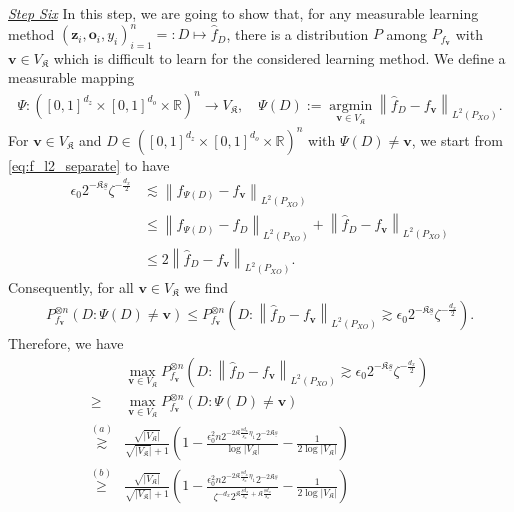 \documentclass[11pt]{article}
\newcommand{\bz}{\mathbf z}
\newcommand{\bv}{\mathbf v}
\newcommand{\bo}{\mathbf o}
\newcommand{\R}{\mathbb{R}}
\newcommand{\0}{\mathbf{0}}
\begin{document}
\begin{appendix}
\vspace{3mm}
\noindent
\underline{\emph{Step Six}}
In this step, we are going to show that, for any measurable learning method $(\bz_i, \bo_i,y_i)_{i=1}^n =: D \mapsto \hat{f}_D$, there is a distribution $P$ among $P_{f_\bv}$ with $\bv \in V_\mathfrak{K}$ which is difficult to learn for the considered learning method. We define a measurable mapping
\begin{align}
    \Psi:\left([0,1]^{d_z}\times[0,1]^{d_o}\times\R\right)^n \rightarrow V_\mathfrak{K}, \quad \Psi(D) := \underset{\bv \in V_\mathfrak{K}}{\operatorname{argmin}} \left\| \hat{f}_D -f_{\bv} \right\|_{L^2(P_{XO})} .
\end{align}
For $\bv \in V_\mathfrak{K}$ and $D \in \left([0,1]^{d_z}\times[0,1]^{d_o}\times\R\right)^n $ with $\Psi(D) \neq \bv$, we start from \eqref{eq:f_l2_separate} to have
\begin{align*}
    \epsilon_0 2^{-\mathfrak{K}\underline{s}} \zeta^{-\frac{d_x}{2}} &\lesssim \left\|f_{\Psi(D)} - f_{\bv} \right\|_{L^2(P_{XO})}\\ &\leq\left\|f_{\Psi(D)} -\hat{f}_D \right\|_{L^2(P_{XO})} + \left\|\hat{f}_D - f_{\bv} \right\|_{L^2(P_{XO})}\\ &\leq 2\left\|\hat{f}_D - f_{\bv} \right\|_{L^2(P_{XO})} .
\end{align*}
Consequently, for all $\bv \in V_\mathfrak{K}$ we find
\begin{align*}
    P_{f_\bv}^{\otimes n}(D: \Psi(D) \neq \bv) \leq P_{f_\bv}^{\otimes n} \left(D:\left\|\hat{f}_D - f_{\bv} \right\|_{L^2(P_{XO})} \gtrsim \epsilon_0 2^{-\mathfrak{K}\underline{s}} \zeta^{-\frac{d_x}{2}}\right) .
\end{align*}
Therefore, we have
\begin{align}
    &\max _{\bv \in V_\mathfrak{K}} P_{f_\bv}^{\otimes n} \left(D:\left\|\hat{f}_D - f_{\bv} \right\|_{L^2(P_{XO})} \gtrsim \epsilon_0 2^{-\mathfrak{K}\underline{s}} \zeta^{-\frac{d_x}{2}}\right) \nonumber \\ 
    \geq & \max _{\bv \in V_\mathfrak{K}} P_{f_\bv}^{\otimes n}(D: \Psi(D) \neq \bv) \nonumber \\
    \stackrel{(a)}{\gtrsim} & \frac{\sqrt{|V_\mathfrak{K}|}}{\sqrt{|V_\mathfrak{K}|} + 1} \left( 1 - \frac{\epsilon_0^2 n 2^{-2\mathfrak{K}\frac{\underline{s}d_x}{s_x} \eta_1} 2^{-2\mathfrak{K}\underline{s}} }{ \log |V_\mathfrak{K}| } -\frac{1}{2 \log |V_\mathfrak{K}|}\right) \nonumber \\
    \stackrel{(b)}{\geq} & \frac{\sqrt{|V_\mathfrak{K}|}}{\sqrt{|V_\mathfrak{K}|} + 1} \left( 1 - \frac{\epsilon_0^2 n2^{-2\mathfrak{K}\frac{\underline{s}d_x}{s_x} \eta_1}2^{-2\mathfrak{K}\underline{s}} }{\zeta^{-d_x}2^{\mathfrak{K}\frac{\underline{s}d_x}{s_x} + \mathfrak{K}\frac{\underline{s}d_o}{s_o}}}  -\frac{1}{2 \log |V_\mathfrak{K}|}\right) \nonumber \\

\end{align}
\end{appendix}
\end{document}
